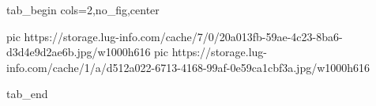  
 
 
 
 


\ifcmt
  tab_begin cols=2,no_fig,center

     pic https://storage.lug-info.com/cache/7/0/20a013fb-59ae-4c23-8ba6-d3d4e9d2ae6b.jpg/w1000h616
		 pic https://storage.lug-info.com/cache/1/a/d512a022-6713-4168-99af-0e59ca1cbf3a.jpg/w1000h616

  tab_end
\fi
